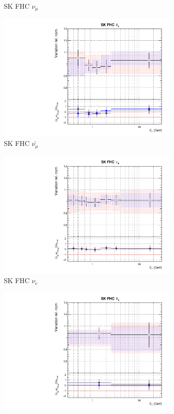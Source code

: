 \begin{figure}[t]
\begin{subfigure}{0.45\textwidth}
  \caption{SK FHC $\nu_{\mu}$}
\end{subfigure}
\begin{subfigure}{0.45\textwidth}
  \centering
  \includegraphics[width=0.75\linewidth]{figs/rhcmpdat28flux_9}
  \caption{SK FHC $\bar{\nu_{\mu}}$}
\end{subfigure}
\begin{subfigure}{0.45\textwidth}
  \centering
  \includegraphics[width=0.75\linewidth]{figs/rhcmpdat248flux_10}
  \caption{SK FHC $\nu_e$}
\end{subfigure}
\begin{subfigure}{0.45\textwidth}
  \centering
  \includegraphics[width=0.75\linewidth]{figs/rhcmpdat28flux_11}

\end{subfigure}
\end{figure}
